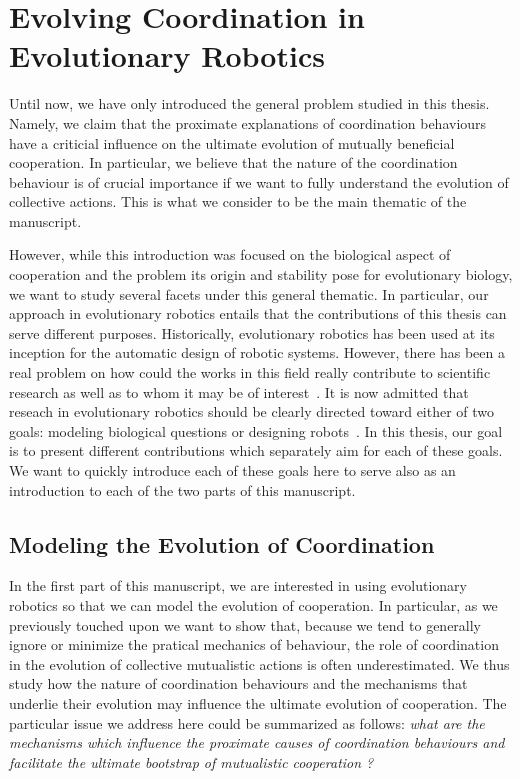 \section{Evolving Coordination in Evolutionary Robotics}

  Until now, we have only introduced the general problem studied in this thesis. Namely, we claim that the proximate explanations of coordination behaviours have a criticial influence on the ultimate evolution of mutually beneficial cooperation. In particular, we believe that the nature of the coordination behaviour is of crucial importance if we want to fully understand the evolution of collective actions. This is what we consider to be the main thematic of the manuscript. 

  However, while this introduction was focused on the biological aspect of cooperation and the problem its origin and stability pose for evolutionary biology, we want to study several facets under this general thematic. In particular, our approach in evolutionary robotics entails that the contributions of this thesis can serve different purposes. Historically, evolutionary robotics has been used at its inception for the automatic design of robotic systems. However, there has been a real problem on how could the works in this field really contribute to scientific research as well as to whom it may be of interest~\parencite{Trianni2014b, Doncieux2015a}. It is now admitted that reseach in evolutionary robotics should be clearly directed toward either of two goals: modeling biological questions or designing robots~\parencite{Trianni2014b}. In this thesis, our goal is to present different contributions which separately aim for each of these goals. We want to quickly introduce each of these goals here to serve also as an introduction to each of the two parts of this manuscript.

  
  \subsection{Modeling the Evolution of Coordination}

    In the first part of this manuscript, we are interested in using evolutionary robotics so that we can model the evolution of cooperation. In particular, as we previously touched upon we want to show that, because we tend to generally ignore or minimize the pratical mechanics of behaviour, the role of coordination in the evolution of collective mutualistic actions is often underestimated. We thus study how the nature of coordination behaviours and the mechanisms that underlie their evolution may influence the ultimate evolution of cooperation. The particular issue we address here could be summarized as follows: \emph{what are the mechanisms which influence the proximate causes of coordination behaviours and facilitate the ultimate bootstrap of mutualistic cooperation ?}

